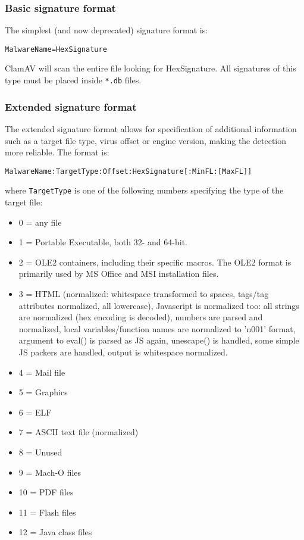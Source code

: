 \documentclass[a4paper,titlepage,12pt]{article}
\begin{document}
    \subsubsection{Basic signature format}
    The simplest (and now deprecated) signature format is:
    \begin{verbatim}
MalwareName=HexSignature
    \end{verbatim}
    ClamAV will scan the entire file looking for HexSignature. All
    signatures of this type must be placed inside \verb+*.db+ files.

    \subsubsection{Extended signature format}\label{ndb}
    The extended signature format allows for specification of additional
    information such as a target file type, virus offset or engine version,
    making the detection more reliable. The format is:
    \begin{verbatim}
MalwareName:TargetType:Offset:HexSignature[:MinFL:[MaxFL]]
    \end{verbatim}
    where \verb+TargetType+ is one of the following numbers specifying
    the type of the target file:
    \begin{itemize}
	\item 0 = any file
	\item 1 = Portable Executable, both 32- and 64-bit.
	\item 2 = OLE2 containers, including their specific macros. The OLE2
    format is primarily used by MS Office and MSI installation files.
	\item 3 = HTML (normalized: whitespace transformed to spaces, tags/tag
	attributes normalized, all lowercase), Javascript is normalized too:
	all strings are normalized (hex encoding is decoded), numbers are
	parsed and normalized, local variables/function names are normalized
	to 'n001' format, argument to eval() is parsed as JS again,
	unescape() is handled, some simple JS packers are handled,
	output is whitespace normalized.
	\item 4 = Mail file
	\item 5 = Graphics
	\item 6 = ELF
	\item 7 = ASCII text file (normalized)
	\item 8 = Unused
	\item 9 = Mach-O files
	\item 10 = PDF files
	\item 11 = Flash files
	\item 12 = Java class files
    \end{itemize}
\end{document}
